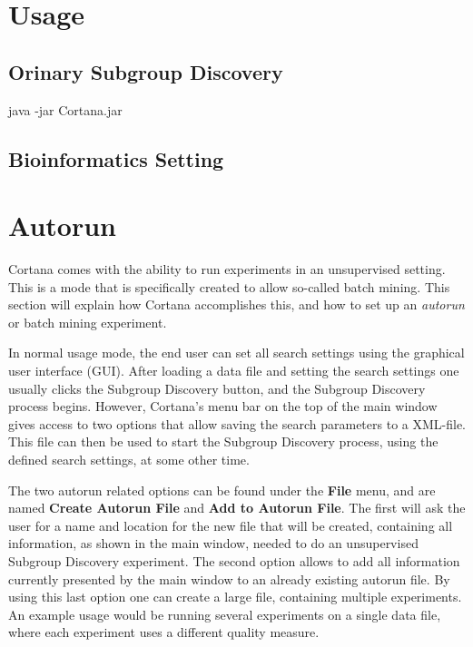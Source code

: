 \documentclass{article}
\begin{document}
\section{Usage}
\label{section:usage}



\subsection{Orinary Subgroup Discovery}
\label{usage:normal}
java -jar Cortana.jar



\subsection{Bioinformatics Setting}
\label{usage:bioinformatics}





\section{Autorun}
\label{section:auto-run}
Cortana comes with the ability to run experiments in an unsupervised setting.
This is a mode that is specifically created to allow so-called batch mining.
This section will explain how Cortana accomplishes this, and how to set up an \emph{autorun} or batch mining experiment.

In normal usage mode, the end user can set all search settings using the graphical user interface (GUI).
After loading a data file and setting the search settings one usually clicks the Subgroup Discovery button, and the Subgroup Discovery process begins.
However, Cortana's menu bar on the top of the main window gives access to two options that allow saving the search parameters to a XML-file.
This file can then be used to start the Subgroup Discovery process, using the defined search settings, at some other time.

The two autorun related options can be found under the \textbf{File} menu, and are named \textbf{Create Autorun File} and \textbf{Add to Autorun File}.
The first will ask the user for a name and location for the new file that will be created, containing all information, as shown in the main window, needed to do an unsupervised Subgroup Discovery experiment.
The second option allows to add all information currently presented by the main window to an already existing autorun file.
By using this last option one can create a large file, containing multiple experiments.
An example usage would be running several experiments on a single data file, where each experiment uses a different quality measure.
\end{document}
